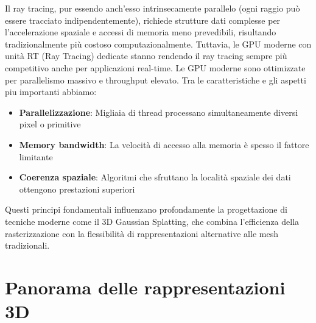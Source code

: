 \noindent Il ray tracing, pur essendo anch'esso intrinsecamente parallelo (ogni raggio può essere tracciato indipendentemente), richiede strutture dati complesse per l'accelerazione spaziale e accessi di memoria meno prevedibili, risultando tradizionalmente più costoso computazionalmente. Tuttavia, le GPU moderne con unità RT (Ray Tracing) dedicate stanno rendendo il ray tracing sempre più competitivo anche per applicazioni real-time.
\noindent Le GPU moderne sono ottimizzate per parallelismo massivo e throughput elevato. 
Tra le caratteristiche e gli aspetti piu importanti abbiamo:

\begin{itemize}
    \item \textbf{Parallelizzazione}: Migliaia di thread processano simultaneamente diversi pixel o primitive
    \item \textbf{Memory bandwidth}: La velocità di accesso alla memoria è spesso il fattore limitante
    \item \textbf{Coerenza spaziale}: Algoritmi che sfruttano la località spaziale dei dati ottengono prestazioni superiori
\end{itemize}

\noindent Questi principi fondamentali influenzano profondamente la progettazione di tecniche moderne come il 3D Gaussian Splatting, che combina l'efficienza della rasterizzazione con la flessibilità di rappresentazioni alternative alle mesh tradizionali.
\section{Panorama delle rappresentazioni 3D}
\label{sec:panoramica}

